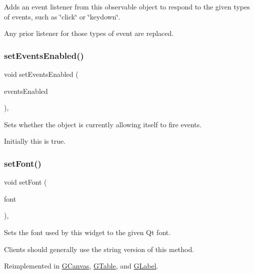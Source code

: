 Adds an event listener from this observable object to respond to the given types of events, such as \char`\"{}click\char`\"{} or \char`\"{}keydown\char`\"{}. 

Any prior listener for those types of event are replaced. \mbox{\label{classGObservable_afaa30b2a9e0f378fd1c70d2f1d0b8216}} 
\subsubsection{\texorpdfstring{set\+Events\+Enabled()}{setEventsEnabled()}}
{\footnotesize\ttfamily void set\+Events\+Enabled (\begin{DoxyParamCaption}\item[{bool}]{events\+Enabled }\end{DoxyParamCaption})\hspace{0.3cm}{\ttfamily [virtual]}, {\ttfamily [inherited]}}



Sets whether the object is currently allowing itself to fire events. 

Initially this is true. \mbox{\label{classGInteractor_a2592348886ffea646c6534bf88f7c49d}} 
\subsubsection{\texorpdfstring{set\+Font()}{setFont()}\hspace{0.1cm}{\footnotesize\ttfamily [1/2]}}
{\footnotesize\ttfamily void set\+Font (\begin{DoxyParamCaption}\item[{const Q\+Font \&}]{font }\end{DoxyParamCaption})\hspace{0.3cm}{\ttfamily [virtual]}, {\ttfamily [inherited]}}



Sets the font used by this widget to the given Qt font. 

Clients should generally use the string version of this method. 

Reimplemented in \mbox{\hyperlink{classGCanvas_a2d22014c7fa3bccfd58c982aea1b55fa}{G\+Canvas}}, \mbox{\hyperlink{classGTable_a2d22014c7fa3bccfd58c982aea1b55fa}{G\+Table}}, and \mbox{\hyperlink{classGLabel_a2d22014c7fa3bccfd58c982aea1b55fa}{G\+Label}}.

